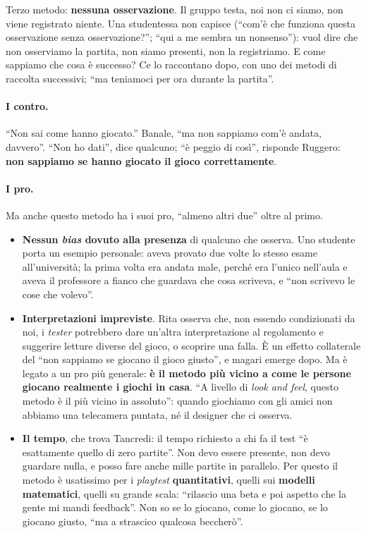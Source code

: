 Terzo metodo: \textbf{nessuna osservazione}. Il gruppo testa, noi non ci siamo, non viene
registrato niente. Una studentessa non capisce (``com'è che funziona questa osservazione
senza osservazione?''; ``qui a me sembra un nonsenso''): vuol dire che non osserviamo la
partita, non siamo presenti, non la registriamo. E come sappiamo che cosa è successo? Ce
lo raccontano dopo, con uno dei metodi di raccolta successivi; ``ma teniamoci per ora
durante la partita''.

\paragraph{I contro.} ``Non sai come hanno giocato.'' Banale, ``ma non sappiamo com'è
andata, davvero''. ``Non ho dati'', dice qualcuno; ``è peggio di così'', risponde
Ruggero: \textbf{non sappiamo se hanno giocato il gioco correttamente}.

\paragraph{I pro.} Ma anche questo metodo ha i suoi pro, ``almeno altri due'' oltre al
primo.
\begin{itemize}
  \item \textbf{Nessun \emph{bias} dovuto alla presenza} di qualcuno che osserva. Uno
        studente porta un esempio personale: aveva provato due volte lo stesso esame
        all'università; la prima volta era andata male, perché era l'unico nell'aula e
        aveva il professore a fianco che guardava che cosa scriveva, e ``non scrivevo le
        cose che volevo''.
  \item \textbf{Interpretazioni impreviste}. Rita osserva che, non essendo condizionati
        da noi, i \emph{tester} potrebbero dare un'altra interpretazione al regolamento
        e suggerire letture diverse del gioco, o scoprire una falla. È un effetto
        collaterale del ``non sappiamo se giocano il gioco giusto'', e magari emerge
        dopo. Ma è legato a un pro più generale: \textbf{è il metodo più vicino a come
        le persone giocano realmente i giochi in casa}. ``A livello di \emph{look and
        feel}, questo metodo è il più vicino in assoluto'': quando giochiamo con gli amici
        non abbiamo una telecamera puntata, né il designer che ci osserva.
  \item \textbf{Il tempo}, che trova Tancredi: il tempo richiesto a chi fa il test ``è
        esattamente quello di zero partite''. Non devo essere presente, non devo
        guardare nulla, e posso fare anche mille partite in parallelo. Per questo il
        metodo è usatissimo per i \emph{playtest} \textbf{quantitativi}, quelli sui
        \textbf{modelli matematici}, quelli su grande scala: ``rilascio una beta e poi
        aspetto che la gente mi mandi feedback''. Non so se lo giocano, come lo giocano,
        se lo giocano giusto, ``ma a strascico qualcosa beccherò''.
\end{itemize}

